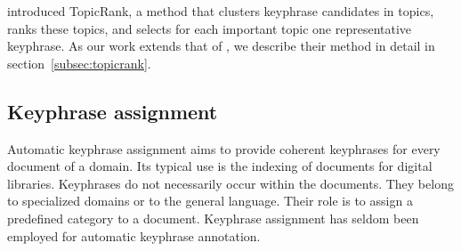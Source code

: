    introduced TopicRank, a method that clusters keyphrase
    candidates in topics, ranks these topics, and %
    selects for each important
    topic one representative keyphrase. %
    As our work extends that of , we describe their method 
    in detail in section~\ref{subsec:topicrank}.



  \subsection{Keyphrase assignment}
  \label{subsec:aka}
    Automatic keyphrase assignment aims to provide coherent keyphrases for every
    document of a %
    domain. Its typical %
    use is the indexing of documents for
    digital libraries. Keyphrases do not necessarily occur within the documents.
    They belong to  specialized domains or to the general language. Their role is to assign a predefined category to a document.
    Keyphrase assignment has %
    seldom been employed for automatic keyphrase annotation.

